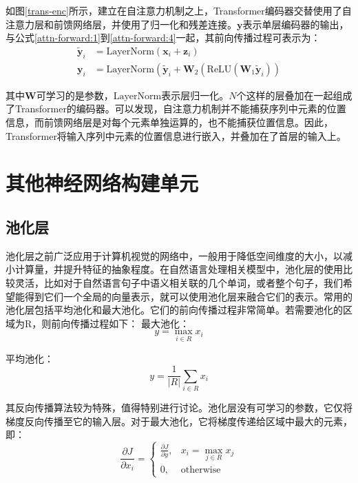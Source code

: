 如图\ref{trans-enc}所示，建立在自注意力机制之上，Transformer编码器交替使用了自注意力层和前馈网络层，并使用了归一化和残差连接。$\bm{y}$表示单层编码器的输出，与公式\ref{attn-forward:1}到\ref{attn-forward:4}一起，其前向传播过程可表示为：
\def\LN{\mathrm{LayerNorm}}
\begin{align}
{\widetilde{\bm{y}}}_i&=\LN\left(\bm{x}_i+\bm{z}_i\right)\\
\bm{y}_i&=\LN\left({\widetilde{\bm{y}}}_i+\bm{W}_2\left(\mathrm{ReLU}\left(\bm{W}_1{\widetilde{\bm{y}}}_i\right)\right)\right.
\end{align}

其中$\bm{W}$可学习的是参数，$\LN$表示层归一化\cite{LayerN16}。$N$个这样的层叠加在一起组成了Transformer的编码器。可以发现，自注意力机制并不能捕获序列中元素的位置信息，而前馈网络层是对每个元素单独运算的，也不能捕获位置信息。因此，Transformer将输入序列中元素的位置信息进行嵌入，并叠加在了首层的输入上。

\section{其他神经网络构建单元}

\subsection{池化层}

池化层之前广泛应用于计算机视觉的网络中，一般用于降低空间维度的大小，以减小计算量，并提升特征的抽象程度。在自然语言处理相关模型中，池化层的使用比较灵活，比如对于自然语言句子中语义相关联的几个单词，或者整个句子，我们希望能得到它们一个全局的向量表示，就可以使用池化层来融合它们的表示。常用的池化层包括平均池化和最大池化。它们的前向传播过程非常简单。若需要池化的区域为R，则前向传播过程如下：
最大池化：
\begin{equation}
    y=\max_{i\in R}{x_i}
\end{equation}

平均池化：
\begin{equation}
    y=\frac{1}{\left|R\right|}\sum_{i\in R}x_i
\end{equation}

其反向传播算法较为特殊，值得特别进行讨论。池化层没有可学习的参数，它仅将梯度反向传播至它的输入层。对于最大池化，它将梯度传递给区域中最大的元素，即：
\begin{equation}
    \frac{\partial J}{\partial x_i}=\begin{cases}
        \frac{\partial J}{\partial y}, & x_i=\max_{j\in R}{x_j}\\
        0, & \mathrm{otherwise}
    \end{cases}
\end{equation}

